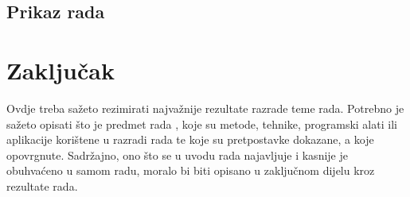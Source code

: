 \documentclass[]{foi} %
\begin{document}
\section{Prikaz rada}

\chapter{Zaključak}

Ovdje treba sažeto rezimirati najvažnije rezultate razrade teme rada. Potrebno je sažeto opisati što je predmet rada \cite{copeland2020ArtificialIntelligence}, koje su metode, tehnike, programski alati ili aplikacije korištene u razradi rada te koje su pretpostavke dokazane, a koje opovrgnute. Sadržajno, ono što se u uvodu rada najavljuje i kasnije je obuhvaćeno u samom radu, moralo bi biti opisano u zaključnom dijelu kroz rezultate rada.

\lipsum[1-2]

\makebackmatter

\appendices %
\end{document}
